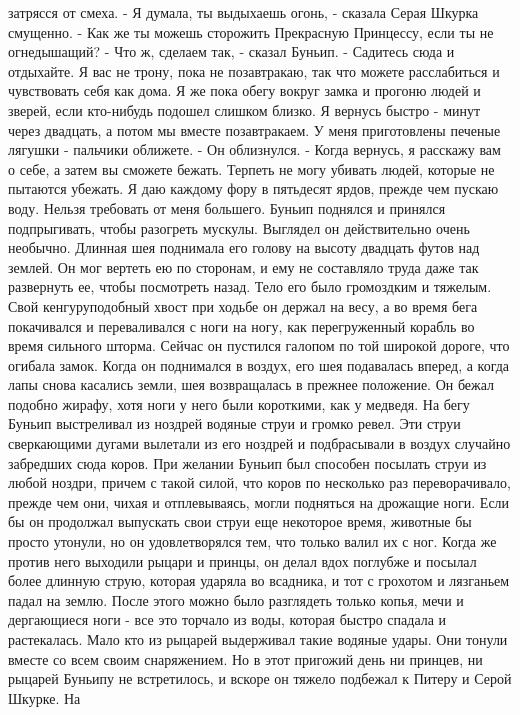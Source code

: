 затрясся от смеха.
    - Я думала, ты выдыхаешь огонь, - сказала Серая Шкурка смущенно. - 
Как же ты можешь сторожить Прекрасную Принцессу, если ты не 
огнедышащий?
    - Что ж, сделаем так, - сказал Буньип. - Садитесь сюда и 
отдыхайте. Я вас не трону, пока не позавтракаю, так что можете 
расслабиться и чувствовать себя как дома. Я же пока обегу вокруг замка 
и прогоню людей и зверей, если кто-нибудь подошел слишком близко. Я 
вернусь быстро - минут через двадцать, а потом мы вместе позавтракаем. 
У меня приготовлены печеные лягушки - пальчики оближете. - Он 
облизнулся. - Когда вернусь, я расскажу вам о себе, а затем вы сможете 
бежать. Терпеть не могу убивать людей, которые не пытаются убежать. Я 
даю каждому фору в пятьдесят ярдов, прежде чем пускаю воду. Нельзя 
требовать от меня большего.
    Буньип поднялся и принялся подпрыгивать, чтобы разогреть мускулы. 
Выглядел он действительно очень необычно. Длинная шея поднимала его 
голову на высоту двадцать футов над землей. Он мог вертеть ею по 
сторонам, и ему не составляло труда даже так развернуть ее, чтобы 
посмотреть назад. Тело его было громоздким и тяжелым. Свой 
кенгуруподобный хвост при ходьбе он держал на весу, а во время бега 
покачивался и переваливался с ноги на ногу, как перегруженный корабль 
во время сильного шторма.
    Сейчас он пустился галопом по той широкой дороге, что огибала 
замок. Когда он поднимался в воздух, его шея подавалась вперед, а 
когда лапы снова касались земли, шея возвращалась в прежнее положение. 
Он бежал подобно жирафу, хотя ноги у него были короткими, как у 
медведя. На бегу Буньип выстреливал из ноздрей водяные струи и громко 
ревел. Эти струи сверкающими дугами вылетали из его ноздрей и 
подбрасывали в воздух случайно забредших сюда коров. При желании 
Буньип был способен посылать струи из любой ноздри, причем с такой 
силой, что коров по несколько раз переворачивало, прежде чем они, 
чихая и отплевываясь, могли подняться на дрожащие ноги.
    Если бы он продолжал выпускать свои струи еще некоторое время, 
животные бы просто утонули, но он удовлетворялся тем, что только валил 
их с ног. Когда же против него выходили рыцари и принцы, он делал вдох 
поглубже и посылал более длинную струю, которая ударяла во всадника, и 
тот с грохотом и лязганьем падал на землю. После этого можно было 
разглядеть только копья, мечи и дергающиеся ноги - все это торчало из 
воды, которая быстро спадала и растекалась. Мало кто из рыцарей 
выдерживал такие водяные удары. Они тонули вместе со всем своим 
снаряжением.
    Но в этот пригожий день ни принцев, ни рыцарей Буньипу не 
встретилось, и вскоре он тяжело подбежал к Питеру и Серой Шкурке. На 
